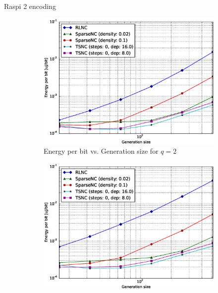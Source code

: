 Raspi 2 encoding

\begin{figure}
    \centering
    \begin{subfigure}[b]{0.475\textwidth}
        \centering
        \includegraphics[width=1.1\textwidth]{images/23_07_2015/energy_per_bit_vs_generation_size_Rasp_v2_Binary_encoder_1600.eps}
        \caption[]%
        {{\small Energy per bit vs. Generation size for $q = 2$}}    
        \label{fig:enc_ene_rasp2_gen_gf2}
    \end{subfigure}
    \hfill
    \begin{subfigure}[b]{0.475\textwidth}  
        \centering 
        \includegraphics[width=1.1\textwidth]{images/23_07_2015/energy_per_bit_vs_generation_size_Rasp_v2_Binary8_encoder_1600.eps}

\end{subfigure}
\end{figure}

